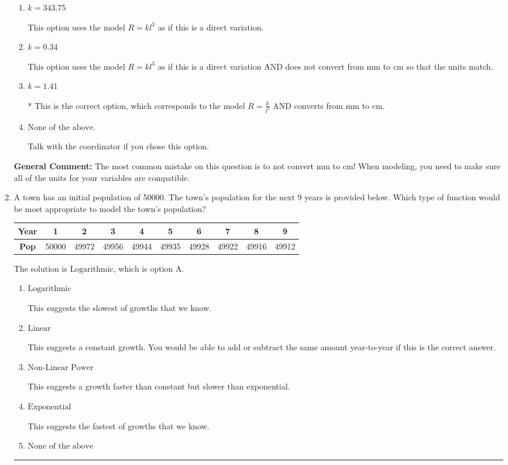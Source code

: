 \documentclass{extbook}[14pt]
\newcommand{\litem}[1]{\item #1

\rule{\textwidth}{0.4pt}}
\begin{document}
\begin{enumerate}
{\begin{enumerate}[label=\Alph*.]
This option uses the correct model, $R = \frac{k}{l^{3}}$, but does not convert from mm to cm so that the units match.
\item \( k = 343.75 \)

This option uses the model $R = kl^{3}$ as if this is a direct variation.
\item \( k = 0.34 \)

This option uses the model $R = kl^{3}$ as if this is a direct variation AND does not convert from mm to cm so that the units match.
\item \( k = 1.41 \)

* This is the correct option, which corresponds to the model $R = \frac{k}{l^{3}}$ AND converts from mm to cm.
\item \( \text{None of the above.} \)

Talk with the coordinator if you chose this option.
\end{enumerate}

\textbf{General Comment:} The most common mistake on this question is to not convert mm to cm! When modeling, you need to make sure all of the units for your variables are compatible.
}
\litem{
A town has an initial population of 50000. The town's population for the next 9 years is provided below. Which type of function would be most appropriate to model the town's population?


\begin{tabular}{c|c|c|c|c|c|c|c|c|c}
\textbf{Year} &1 &2 &3 &4 &5 &6 &7 &8 &9\tabularnewline \hline
\textbf{Pop} &50000 &49972 &49956 &49944 &49935 &49928 &49922 &49916 &49912\end{tabular}The solution is \( \text{Logarithmic} \), which is option A.\begin{enumerate}[label=\Alph*.]
\item \( \text{Logarithmic} \)

This suggests the slowest of growths that we know.
\item \( \text{Linear} \)

This suggests a constant growth. You would be able to add or subtract the same amount year-to-year if this is the correct answer.
\item \( \text{Non-Linear Power} \)

This suggests a growth faster than constant but slower than exponential.
\item \( \text{Exponential} \)

This suggests the fastest of growths that we know.
\item \( \text{None of the above} \)


\end{enumerate}}
\end{enumerate}
\end{document}
